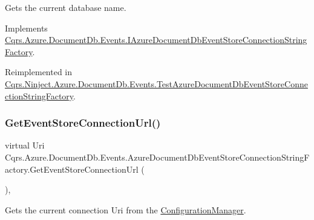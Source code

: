 Gets the current database name. 



Implements \hyperlink{interfaceCqrs_1_1Azure_1_1DocumentDb_1_1Events_1_1IAzureDocumentDbEventStoreConnectionStringFactory_a826c95e8dab31be9ef97cf3bea92d95d_a826c95e8dab31be9ef97cf3bea92d95d}{Cqrs.\+Azure.\+Document\+Db.\+Events.\+I\+Azure\+Document\+Db\+Event\+Store\+Connection\+String\+Factory}.



Reimplemented in \hyperlink{classCqrs_1_1Ninject_1_1Azure_1_1DocumentDb_1_1Events_1_1TestAzureDocumentDbEventStoreConnectionStringFactory_a85b4e6cd45d285be6de5db19148118b9_a85b4e6cd45d285be6de5db19148118b9}{Cqrs.\+Ninject.\+Azure.\+Document\+Db.\+Events.\+Test\+Azure\+Document\+Db\+Event\+Store\+Connection\+String\+Factory}.

\mbox{\label{classCqrs_1_1Azure_1_1DocumentDb_1_1Events_1_1AzureDocumentDbEventStoreConnectionStringFactory_a53d282392000624128304c6477a2a466_a53d282392000624128304c6477a2a466}} 
\subsubsection{\texorpdfstring{Get\+Event\+Store\+Connection\+Url()}{GetEventStoreConnectionUrl()}}
{\footnotesize\ttfamily virtual Uri Cqrs.\+Azure.\+Document\+Db.\+Events.\+Azure\+Document\+Db\+Event\+Store\+Connection\+String\+Factory.\+Get\+Event\+Store\+Connection\+Url (\begin{DoxyParamCaption}{ }\end{DoxyParamCaption})\hspace{0.3cm}{\ttfamily [protected]}, {\ttfamily [virtual]}}



Gets the current connection Uri from the \hyperlink{namespaceCqrs_1_1Azure_1_1ConfigurationManager}{Configuration\+Manager}. 




